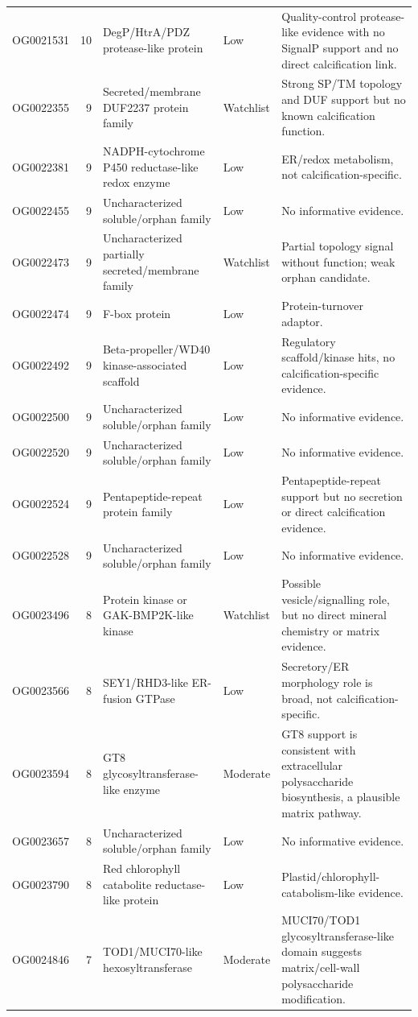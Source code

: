 \begin{longtable}{p{1.9cm}r p{4.55cm}p{1.8cm}p{5.55cm}}
OG0021531 & 10 & DegP/HtrA/PDZ protease-like protein & Low & Quality-control protease-like evidence with no SignalP support and no direct calcification link.\\
OG0022355 & 9 & Secreted/membrane DUF2237 protein family & Watchlist & Strong SP/TM topology and DUF support but no known calcification function.\\
OG0022381 & 9 & NADPH-cytochrome P450 reductase-like redox enzyme & Low & ER/redox metabolism, not calcification-specific.\\
OG0022455 & 9 & Uncharacterized soluble/orphan family & Low & No informative evidence.\\
OG0022473 & 9 & Uncharacterized partially secreted/membrane family & Watchlist & Partial topology signal without function; weak orphan candidate.\\
OG0022474 & 9 & F-box protein & Low & Protein-turnover adaptor.\\
OG0022492 & 9 & Beta-propeller/WD40 kinase-associated scaffold & Low & Regulatory scaffold/kinase hits, no calcification-specific evidence.\\
OG0022500 & 9 & Uncharacterized soluble/orphan family & Low & No informative evidence.\\
OG0022520 & 9 & Uncharacterized soluble/orphan family & Low & No informative evidence.\\
OG0022524 & 9 & Pentapeptide-repeat protein family & Low & Pentapeptide-repeat support but no secretion or direct calcification evidence.\\
OG0022528 & 9 & Uncharacterized soluble/orphan family & Low & No informative evidence.\\
OG0023496 & 8 & Protein kinase or GAK-BMP2K-like kinase & Watchlist & Possible vesicle/signalling role, but no direct mineral chemistry or matrix evidence.\\
OG0023566 & 8 & SEY1/RHD3-like ER-fusion GTPase & Low & Secretory/ER morphology role is broad, not calcification-specific.\\
OG0023594 & 8 & GT8 glycosyltransferase-like enzyme & Moderate & GT8 support is consistent with extracellular polysaccharide biosynthesis, a plausible matrix pathway.\\
OG0023657 & 8 & Uncharacterized soluble/orphan family & Low & No informative evidence.\\
OG0023790 & 8 & Red chlorophyll catabolite reductase-like protein & Low & Plastid/chlorophyll-catabolism-like evidence.\\
OG0024846 & 7 & TOD1/MUCI70-like hexosyltransferase & Moderate & MUCI70/TOD1 glycosyltransferase-like domain suggests matrix/cell-wall polysaccharide modification.\\

\end{longtable}
